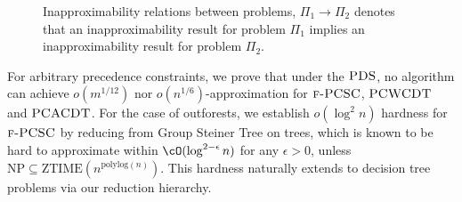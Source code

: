 \begin{figure}[ht!]
    \centering
    
    \caption{Inapproximability relations between problems, $\Pi_1 \to \Pi_2$ denotes that an inapproximability result for problem $\Pi_1$ implies an inapproximability result for problem $\Pi_2$.}
    \label{ea:fig:hardness_diagram}
\end{figure}



For arbitrary precedence constraints, we prove that under the $\textup{\textsc{PDS}}$, no algorithm can achieve $o(m^{1/12})$ nor $o(n^{1/6})$-approximation for $\textup{\textsc{f-PCSC}}$, $\textup{\textsc{PCWCDT}}$ and $\textup{\textsc{PCACDT}}$. For the case of outforests, we establish $o(\log^2 n)$ hardness for $\textup{\textsc{f-PCSC}}$ by reducing from Group Steiner Tree on trees, which is known to be hard to approximate within $\cO(\log^{2-\epsilon} n)$ for any $\epsilon>0$, unless $\text{NP}\subseteq \text{ZTIME}(n^{\text{polylog}(n)})$. This hardness naturally extends to decision tree problems via our reduction hierarchy.



